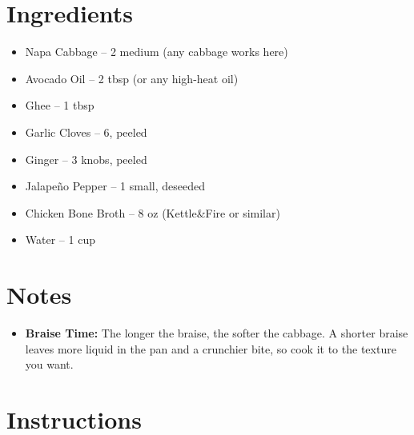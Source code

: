 




\section*{Ingredients}

\begin{itemize}
      \item[\cut] Napa Cabbage – 2 medium (any cabbage works here)
      \item[\measure] Avocado Oil – 2 tbsp (or any high-heat oil)
      \item Ghee – 1 tbsp
      \item[\cut] Garlic Cloves – 6, peeled
      \item[\cut] Ginger – 3 knobs, peeled
      \item[\cut] Jalapeño Pepper – 1 small, deseeded
      \item[\measure] Chicken Bone Broth – 8 oz (Kettle\&Fire or similar)
      \item[\measure] Water – 1 cup
\end{itemize}

\section*{Notes}

\begin{itemize}
      \item \textbf{Braise Time:} The longer the braise, the softer the cabbage. A shorter braise leaves more liquid in the pan and a crunchier bite, so cook it to the texture you want.
\end{itemize}

\newpage
{}
\section*{Instructions}

